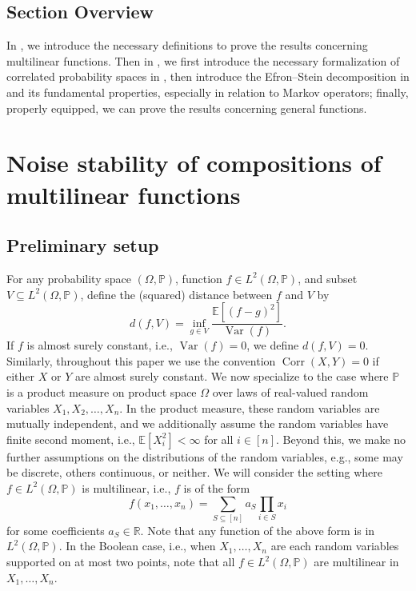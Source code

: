 \documentclass[12pt,letterpaper]{amsart}
\def\E{\mathbb{E}}
\def\P{\mathbb{P}}
\def\R{\mathbb{R}}
\def\Var{\operatorname{Var}}
\def\Corr{\operatorname{Corr}}
\newcommand{\1}[1]{1_{\left\{#1\right\}}}
\theoremstyle{definition}
\theoremstyle{remark}
\begin{document}
\subsection{Section Overview}
In , we introduce the necessary definitions to prove the results concerning multilinear functions.
Then in , we first introduce the necessary formalization of correlated probability spaces in , then introduce the Efron--Stein decomposition in  and its fundamental properties, especially in relation to Markov operators; finally, properly equipped, we can prove the results concerning general functions.

\section{Noise stability of compositions of multilinear functions}\label{sec:multilinear}
\subsection{Preliminary setup}
For any probability space $(\Omega,\P)$, function $f\in L^2(\Omega,\P)$, and subset $V\subseteq L^2(\Omega,\P)$, define the (squared) distance between $f$ and $V$ by
\[ d(f,V) = \inf_{g\in V}\frac{\E[(f-g)^2]}{\Var(f)}. \]
If $f$ is almost surely constant, i.e., $\Var(f)=0$, we define $d(f,V)=0$.
Similarly, throughout this paper we use the convention $\Corr(X,Y)=0$ if either $X$ or $Y$ are almost surely constant.
We now specialize to the case where $\P$ is a product measure on product space $\Omega$ over laws of real-valued random variables $X_1,X_2,\dots,X_n$.
In the product measure, these random variables are mutually independent, and we additionally assume the random variables have finite second moment, i.e., $\E[X_i^2]<\infty$ for all $i\in[n]$.
Beyond this, we make no further assumptions on the distributions of the random variables, e.g., some may be discrete, others continuous, or neither.
We will consider the setting where $f\in L^2(\Omega,\P)$ is multilinear, i.e., $f$ is of the form
\[ f(x_1,\dots,x_n) = \sum_{S\subseteq[n]}a_S \prod_{i\in S}x_i \]
for some coefficients $a_S\in\R$.
Note that any function of the above form is in $L^2(\Omega,\P)$.
In the Boolean case, i.e., when $X_1,\dots,X_n$ are each random variables supported on at most two points, note that all $f\in L^2(\Omega,\P)$ are multilinear in $X_1,\dots,X_n$.
\end{document}
